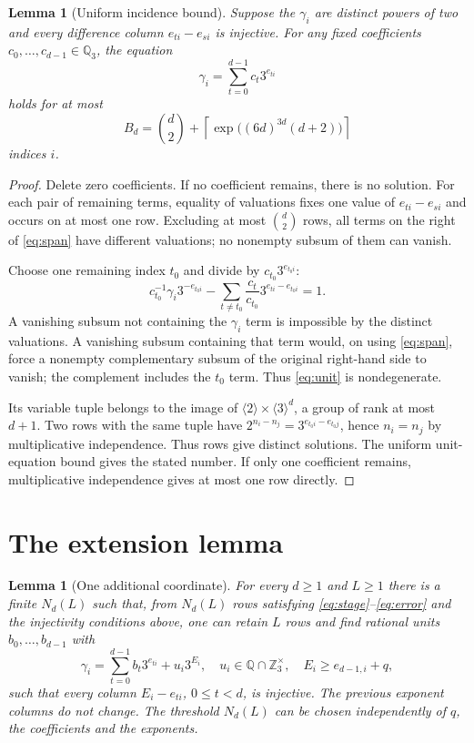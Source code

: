 \documentclass[11pt]{article}
\newtheorem{lemma}[theorem]{Lemma}
\theoremstyle{definition}
\theoremstyle{remark}
\newcommand{\Z}{\mathbb Z}
\newcommand{\Q}{\mathbb Q}
\begin{document}
\begin{lemma}[Uniform incidence bound]\label{lem:incidence}
Suppose the $\gamma_i$ are distinct powers of two and every difference
column $e_{ti}-e_{si}$ is injective. For any fixed coefficients
$c_0,\ldots,c_{d-1}\in\Q_3$, the equation
\begin{equation}\label{eq:span}
 \gamma_i=\sum_{t=0}^{d-1}c_t3^{e_{ti}}
\end{equation}
holds for at most
\[
 B_d=\binom d2+\left\lceil
 \exp\bigl((6d)^{3d}(d+2)\bigr)\right\rceil
\]
indices $i$.
\end{lemma}
\begin{proof}
Delete zero coefficients. If no coefficient remains, there is no
solution. For each pair of remaining terms, equality of valuations fixes
one value of $e_{ti}-e_{si}$ and occurs on at most one row. Excluding
at most $\binom d2$ rows, all terms on the right of \eqref{eq:span}
have different valuations; no nonempty subsum of them can vanish.

Choose one remaining index $t_0$ and divide by $c_{t_0}3^{e_{t_0i}}$:
\begin{equation}\label{eq:unit}
 c_{t_0}^{-1}\gamma_i3^{-e_{t_0i}}
 -\sum_{t\ne t_0}\frac{c_t}{c_{t_0}}3^{e_{ti}-e_{t_0i}}=1.
\end{equation}
A vanishing subsum not containing the $\gamma_i$ term is impossible by
the distinct valuations. A vanishing subsum containing that term would,
on using \eqref{eq:span}, force a nonempty complementary subsum of the
original right-hand side to vanish; the complement includes the
$t_0$ term. Thus \eqref{eq:unit} is nondegenerate.

Its variable tuple belongs to the image of
$\langle2\rangle\times\langle3\rangle^d$, a group of rank at most
$d+1$. Two rows with the same tuple have
$2^{n_i-n_j}=3^{e_{t_0i}-e_{t_0j}}$, hence $n_i=n_j$ by multiplicative
independence. Thus rows give distinct solutions. The uniform
unit-equation bound gives the stated number. If only one coefficient
remains, multiplicative independence gives at most one row directly.
\end{proof}

\section{The extension lemma}

\begin{lemma}[One additional coordinate]\label{lem:extension}
For every $d\ge1$ and $L\ge1$ there is a finite $N_d(L)$ such that,
from $N_d(L)$ rows satisfying \eqref{eq:stage}--\eqref{eq:error} and the
injectivity conditions above, one can retain $L$ rows and find rational
units $b_0,\ldots,b_{d-1}$ with
\begin{equation}\label{eq:newresidual}
 \gamma_i=\sum_{t=0}^{d-1}b_t3^{e_{ti}}+u_i3^{E_i},
 \quad u_i\in\Q\cap\Z_3^\times,
 \quad E_i\ge e_{d-1,i}+q,
\end{equation}
such that every column $E_i-e_{ti}$, $0\le t<d$, is injective.
The previous exponent columns do not change. The threshold $N_d(L)$
can be chosen independently of $q$, the coefficients and the exponents.
\end{lemma}
\end{document}
